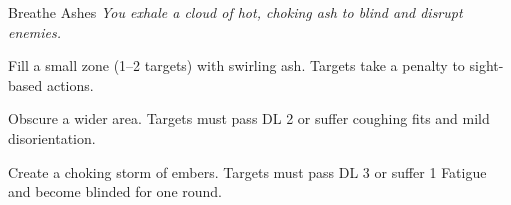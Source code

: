 \begin{multicols}{2}
\begin{WyrdSpell}[Ashcraft]{Breathe Ashes}
    \textit{You exhale a cloud of hot, choking ash to blind and disrupt enemies.}
    
    \begin{WyrdSpellBlock}
        \item[+1] Fill a small zone (1–2 targets) with swirling ash. Targets take a penalty to sight-based actions.
        \item[+2] Obscure a wider area. Targets must pass DL 2 or suffer coughing fits and mild disorientation.
        \item[+3] Create a choking storm of embers. Targets must pass DL 3 or suffer 1 Fatigue and become blinded for one round.
    \end{WyrdSpellBlock}
\end{WyrdSpell}

\end{multicols}


